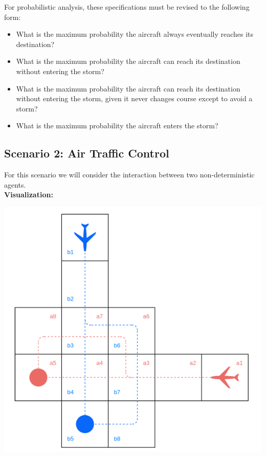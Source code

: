 \documentclass{article}
\begin{document}
For probabilistic analysis, these specifications must be revised to the following form:

\begin{itemize}
    \setlength\itemsep{0em}
    \item What is the maximum probability the aircraft always eventually reaches its destination?

    \item What is the maximum probability the aircraft can reach its destination without entering the storm?

    \item What is the maximum probability the aircraft can reach its destination without entering the storm, given it never changes course except to avoid a storm?

    \item What is the maximum probability the aircraft enters the storm?
\end{itemize}

\subsection*{Scenario 2: Air Traffic Control}

For this scenario we will consider the interaction between two non-deterministic agents. \\

\textbf{Visualization:}

\begin{center}
    \includegraphics[scale=.4]{figs/air_traffic_control.png}
\end{center}
\end{document}
